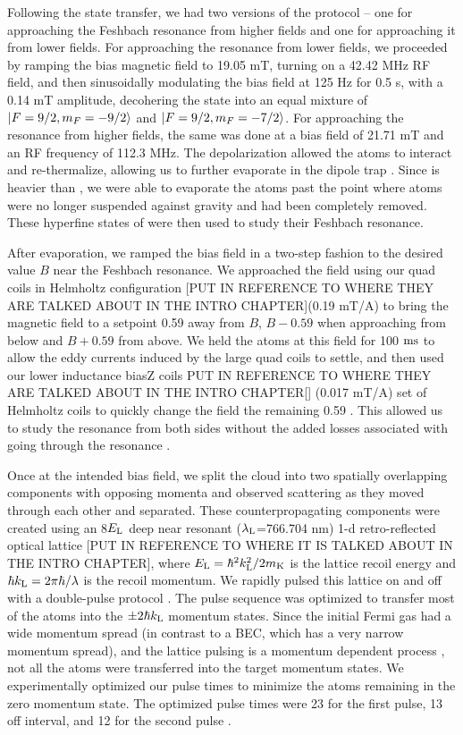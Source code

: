 Following the state transfer, we had two versions of the protocol \--- one for approaching the Feshbach resonance from higher fields and one for approaching it from lower fields. For approaching the resonance from lower fields, we proceeded by ramping the bias magnetic field to 19.05 mT, turning on a 42.42 MHz RF field, and then sinusoidally modulating the bias field at 125 Hz for 0.5 s, with a 0.14 mT amplitude, decohering the \K{} state into an equal mixture of $\mathinner{|{F=9/2,m_F=-9/2}\rangle}$ and $\mathinner{|{F=9/2,m_F=-7/2}\rangle}$. For approaching the resonance from higher fields, the same was done at a bias field of 21.71 mT and an RF frequency of 112.3 MHz. The depolarization allowed the \K{} atoms to interact and re-thermalize, allowing us to further evaporate in the dipole trap \cite{DeMarco99}. Since \Rb{} is heavier than \K{}, we were able to evaporate the \K{} atoms past the point where \Rb{} atoms were no longer suspended against gravity and had been completely removed.  These hyperfine states of \K{} were then used to study their Feshbach resonance.


After evaporation, we ramped the bias field in a two-step fashion to the desired value $B$ near the Feshbach resonance. We approached the field using our quad coils in Helmholtz configuration [PUT IN REFERENCE TO WHERE THEY ARE TALKED ABOUT IN THE INTRO CHAPTER](0.19 mT/A) to bring the magnetic field to a setpoint 0.59 \mT{} away from $B$,  $B-0.59$ \mT{} when approaching from below and $B+0.59$  \mT{} from above. We held the atoms at this field for 100 $\rm{ms}$ to allow the eddy currents induced by the large quad coils to settle, and then used our lower inductance biasZ coils PUT IN REFERENCE TO WHERE THEY ARE TALKED ABOUT IN THE INTRO CHAPTER[] (0.017 mT/A) set of Helmholtz coils to quickly change the field the remaining 0.59 \mT{}. This allowed us to study the resonance from both sides without the added losses associated with going through the resonance \cite{Chin10}.

Once at the intended bias field, we split the cloud into two spatially overlapping components with opposing momenta  and observed scattering as they moved through each other and separated. These counterpropagating components were created using an  8$E_{\rm{L}}$ deep near resonant ($\lambda_{\rm{L}}$=766.704 nm) 1-d retro-reflected optical lattice  [PUT IN REFERENCE TO WHERE IT IS TALKED ABOUT IN THE INTRO CHAPTER], where $E_{\rm{L}}=\hbar^2 k_{\rm{L}}^2/2m_{\rm{K}}$ is the lattice recoil energy and $\hbar k_{\rm{L}}=2\pi \hbar/ \lambda$ is the recoil momentum. We rapidly pulsed this lattice on and off with a double-pulse protocol \cite{Wu05, Edwards10}. The pulse sequence was optimized to transfer most of the atoms into the $\pm 2 \hbar k_{\rm{L}}$ momentum states. Since the initial Fermi gas had a wide momentum spread (in contrast to a BEC, which has a very narrow momentum spread), and the lattice pulsing is a momentum dependent process  \cite{Wu05}, not all the atoms were transferred into the target momentum states. We experimentally optimized our pulse times to minimize the atoms remaining in the zero momentum state. The optimized pulse times were 23 \us{} for the first pulse, 13 \us{} off interval, and 12 \us{} for the second pulse \cite{Edwards10}.

